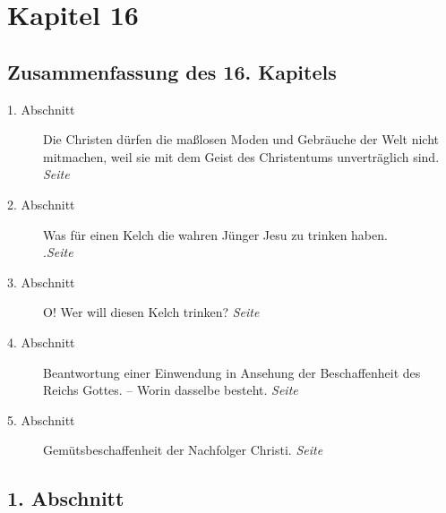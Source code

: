 \chapter{Kapitel 16} \label{kap16}
\section{Zusammenfassung des 16. Kapitels}

\begin{description}
\item[1. Abschnitt] Die Christen dürfen die maßlosen
Moden und Gebräuche der Welt
nicht mitmachen, weil sie mit dem Geist des Christentums unverträglich sind.
\dotfill \textit{Seite~\pageref{kap16_ab1}}\\
\item[2. Abschnitt] Was für einen Kelch die wahren Jünger Jesu zu trinken haben.\\
.\dotfill \textit{Seite~\pageref{kap16_ab2}}\\
\item[3. Abschnitt] O! Wer will diesen Kelch trinken?
\dotfill \textit{Seite~\pageref{kap16_ab3}}\\
\item[4. Abschnitt] Beantwortung einer Einwendung in Ansehung der Beschaffenheit
des Reichs Gottes. -- Worin dasselbe besteht.
\dotfill \textit{Seite~\pageref{kap16_ab4}}\\
\item[5. Abschnitt] Gemütsbeschaffenheit der Nachfolger Christi.
\dotfill \textit{Seite~\pageref{kap16_ab5}}\\

\end{description}

\newpage

\section{1. Abschnitt} \label{kap16_ab1}

